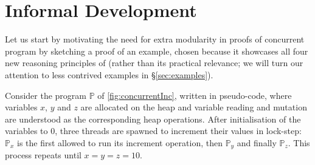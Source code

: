 \section{Informal Development}
\label{sec:intuition}

Let us start by motivating the need for extra modularity in proofs of
concurrent program by sketching a proof of an example, chosen because
it showcases all four new reasoning principles of \colosl (rather than
its practical relevance; we will turn our attention to less contrived
examples in \S\ref{sec:examples}).

Consider the program $\mathbb{P}$ of \fig\ref{fig:concurrentInc},
written in pseudo-code, where variables $x$, $y$ and $z$ are allocated
on the heap and variable reading and mutation are understood as the
corresponding heap operations. After initialisation of the variables
to $0$, three threads are spawned to increment their values in
lock-step: $\mathbb{P}_x$ is the first allowed to run its increment
operation, then $\mathbb{P}_y$ and finally $\mathbb{P}_z$. This
process repeats until $x = y = z = 10$.

